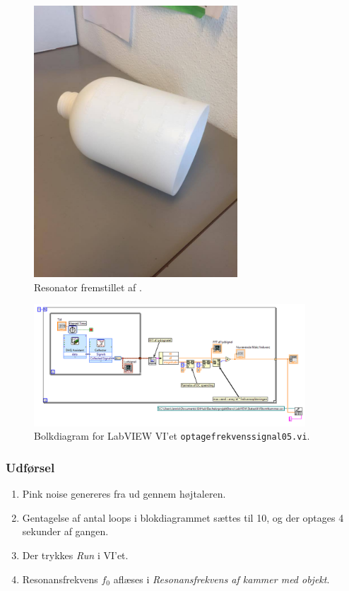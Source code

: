 	\begin{figure}
	\centering
	\includegraphics[width=3in]{resonator.jpg}
	\caption{Resonator fremstillet af .}
	\label{fig:resonator}	
	\end{figure}

	\begin{figure}
	\centering
	\includegraphics[width=4in]{optagefrekvenssignal05.png}
	\caption{Bolkdiagram for LabVIEW VI'et \texttt{optagefrekvenssignal05.vi}.}
	\label{fig:optagefrekvenssignal05}	
	\end{figure}
	
	\subsubsection{Udførsel}
			
			\begin{enumerate}
			\item Pink noise genereres fra \onlineg  ud gennem højtaleren. 
			\item Gentagelse af antal loops i blokdiagrammet sættes til 10, og der optages 4 sekunder af gangen. 
			\item Der trykkes \textit{Run} i VI'et. 
			\item Resonansfrekvens $f_{0}$ aflæses i \textit{Resonansfrekvens af kammer med objekt}.
			\end{enumerate}
			
